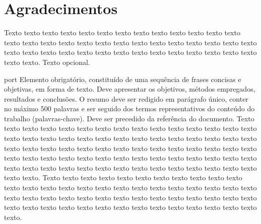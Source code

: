 \documentclass[11pt,twoside,english,brazil]{book}
\begin{document}

\chapter*{Agradecimentos}

Texto texto texto texto texto texto texto texto texto texto texto texto texto
texto texto texto texto texto texto texto texto texto texto texto texto texto
texto texto texto texto texto texto texto texto texto texto texto texto texto
texto texto texto texto. Texto opcional.

\begin{resumo}{port}
Elemento obrigatório, constituído de uma sequência de frases concisas e
objetivas, em forma de texto.  Deve apresentar os objetivos, métodos empregados,
resultados e conclusões.  O resumo deve ser redigido em parágrafo único, conter
no máximo 500 palavras e ser seguido dos termos representativos do conteúdo do
trabalho (palavras-chave). Deve ser precedido da referência do documento.
Texto texto texto texto texto texto texto texto texto texto texto texto texto
texto texto texto texto texto texto texto texto texto texto texto texto texto
texto texto texto texto texto texto texto texto texto texto texto texto texto
texto texto texto texto texto texto texto texto texto texto texto texto texto
texto texto texto texto texto texto texto texto texto texto texto texto texto
texto texto texto texto texto texto texto texto.
Texto texto texto texto texto texto texto texto texto texto texto texto texto
texto texto texto texto texto texto texto texto texto texto texto texto texto
texto texto texto texto texto texto texto texto texto texto texto texto texto
texto texto texto texto texto texto texto texto texto texto texto texto texto
texto texto.
\end{resumo}
\end{document}
